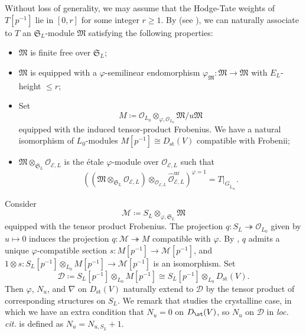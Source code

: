 Without loss of generality, we may assume that the Hodge-Tate weights of $T[p^{-1}]$ lie in $[0, r]$ for some integer $r \geq 1$. By \cite[Thm.~3.2.3, Lem.~4.2.9]{gao-integral-padic-hodge-imperfect} (see \cite[\S4.3]{moon-strly-div-latt-cryst-cohom-CDVF}), we can naturally associate to $T$ an $\mathfrak{S}_L$-module $\mathfrak{M}$ satisfying the following properties:
\begin{itemize}
    \item $\mathfrak{M}$ is finite free over $\mathfrak{S}_L$;
    \item $\mathfrak{M}$ is equipped with a $\varphi$-semilinear endomorphism $\varphi_{\mathfrak{M}}\colon \mathfrak{M} \rightarrow \mathfrak{M}$ with $E_L$-height $\leq r$;
    \item Set 
    \[
    M \coloneqq \mathcal{O}_{L_0}\otimes_{\varphi,\mathcal{O}_{L_0}}\mathfrak{M}/u\mathfrak{M}
    \]
    equipped with the induced tensor-product Frobenius. We have a natural isomorphism of $L_0$-modules $M[p^{-1}] \cong D_{\mathrm{st}}(V)$ compatible with Frobenii;
    \item $\mathfrak{M}\otimes_{\mathfrak{S}_L} \mathcal{O}_{\mathcal{E}, L}$ is the \'etale $\varphi$-module over $\mathcal{O}_{\mathcal{E}, L}$ such that 
    \[
    ((\mathfrak{M}\otimes_{\mathfrak{S}_L} \mathcal{O}_{\mathcal{E}, L})\otimes_{\mathcal{O}_{\mathcal{E}, L}} \widehat{\mathcal{O}}_{\mathcal{E}, L}^{\mathrm{ur}})^{\varphi = 1} =  T|_{G_{\widetilde{L}_{\infty}}}.
    \]
\end{itemize}

Consider
\[
\mathscr{M} \coloneqq S_L\otimes_{\varphi, \mathfrak{S}_L} \mathfrak{M}
\]
equipped with the tensor product Frobenius. The projection $q\colon S_L \twoheadrightarrow \mathcal{O}_{L_0}$ given by $u \mapsto 0$ induces the projection $q\colon \mathscr{M} \twoheadrightarrow M$ compatible with $\varphi$. By \cite[Lem.~4.2]{du-liu-moon-shimizu-completed-prismatic-F-crystal-loc-system}, $q$ admits a unique $\varphi$-compatible section $s\colon M[p^{-1}] \rightarrow \mathscr{M}[p^{-1}]$, and $1\otimes s\colon S_L[p^{-1}]\otimes_{L_0}M[p^{-1}] \rightarrow \mathscr{M}[p^{-1}]$ is an isomorphism. Set 
\[
\mathscr{D} \coloneqq S_L[p^{-1}]\otimes_{L_0} M[p^{-1}] \cong S_L[p^{-1}]\otimes_{L_0} D_{\mathrm{st}}(V).
\]
Then $\varphi$, $N_u$, and $\nabla$ on $D_{\mathrm{st}}(V)$ naturally extend to $\mathscr{D}$ by the tensor product of corresponding structures on $S_L$. We remark that \cite[\S4.3]{du-liu-moon-shimizu-completed-prismatic-F-crystal-loc-system} studies the crystalline case, in which we have an extra condition that $N_u=0$ on $D_\st(V)$, so $N_u$ on $\mathscr{D}$ in \textit{loc. cit.} is defined as $N_u=N_{u,S_L}+1$.

